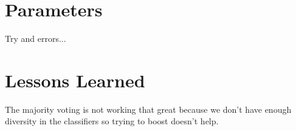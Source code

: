 \documentclass[a4paper, 11pt]{article}
\begin{document}
\section{Parameters}

Try and errors...

\section{Lessons Learned}

The majority voting is not working that great because we don't have enough diversity in the classifiers so trying to boost doesn't help.
\end{document}
